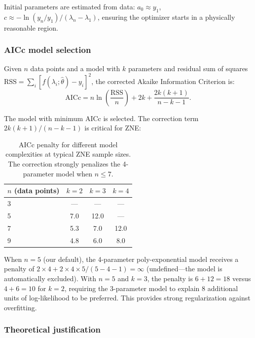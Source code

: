 Initial parameters are estimated from data: $a_0 \approx y_1$, $c \approx -\ln(y_n/y_1)/(\lambda_n - \lambda_1)$, ensuring the optimizer starts in a physically reasonable region.

\subsubsection{AICc model selection}

Given $n$ data points and a model with $k$ parameters and residual sum of squares $\text{RSS} = \sum_i [f(\lambda_i;\hat\theta) - y_i]^2$, the corrected Akaike Information Criterion is:
\begin{equation}
    \text{AICc} = n\ln\!\left(\frac{\text{RSS}}{n}\right) + 2k + \frac{2k(k+1)}{n-k-1}.
    \label{eq:aicc}
\end{equation}

The model with minimum AICc is selected. The correction term $2k(k+1)/(n-k-1)$ is critical for ZNE:

\begin{table}[!htbp]
\caption{AICc penalty for different model complexities at typical ZNE sample sizes. The correction strongly penalizes the 4-parameter model when $n \leq 7$.}
\label{tab:aicc_penalty}
\begin{ruledtabular}
\begin{tabular}{lccc}
$n$ (data points) & $k=2$ & $k=3$ & $k=4$ \\
\hline
3 & --- & --- & --- \\
5 & 7.0 & 12.0 & --- \\
7 & 5.3 & 7.0 & 12.0 \\
9 & 4.8 & 6.0 & 8.0 \\
\end{tabular}
\end{ruledtabular}
\end{table}

When $n=5$ (our default), the 4-parameter poly-exponential model receives a penalty of $2 \times 4 + 2 \times 4 \times 5 / (5-4-1) = \infty$ (undefined---the model is automatically excluded). With $n=5$ and $k=3$, the penalty is $6 + 12 = 18$ versus $4 + 6 = 10$ for $k=2$, requiring the 3-parameter model to explain 8 additional units of log-likelihood to be preferred. This provides strong regularization against overfitting.

\subsubsection{Theoretical justification}

